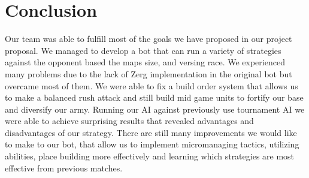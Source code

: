 \documentclass{article}
\begin{document}
\section{Conclusion}

Our team was able to fulfill most of the goals we have proposed in our project proposal. We managed to develop a bot that can run a variety of strategies against the opponent based the maps size, and versing race. We experienced many problems due to the lack of Zerg implementation in the original bot but overcame most of them. We were able to fix a build order system that allows us to make a balanced rush attack and still build mid game units to fortify our base and diversify our army. Running our AI against previously use tournament AI we were able to achieve surprising results that revealed advantages and disadvantages of our strategy. There are still many improvements we would like to make to our bot, that allow us to implement micromanaging tactics, utilizing abilities, place building more effectively and learning which strategies are most effective from previous matches. 


\printbibliography
\end{document}
